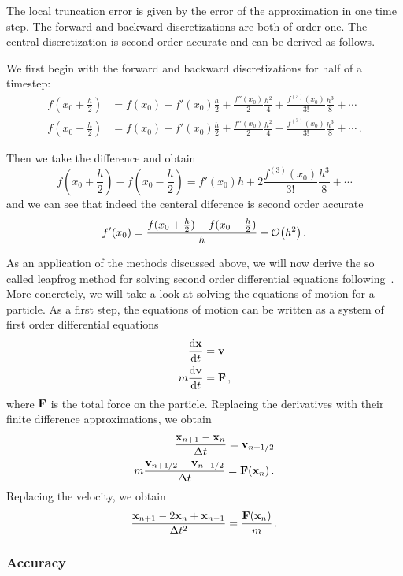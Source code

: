 \documentclass[class=report, crop=false]{standalone}
\begin{document}
The local truncation error is given by the error of the approximation in one time
step. The forward and backward discretizations are both of order one. The
central discretization is second order accurate and can be derived as follows.

We first begin with the forward and backward discretizations for half of a
timestep:
\begin{align*}
  f(x_0+\frac{h}{2}) &= f(x_0) + f'(x_0)\frac{h}{2} + \frac{f''(x_0)}{2}\frac{h^2}{4}
    + \frac{f^{(3)}(x_0)}{3!}\frac{h^3}{8} + \dotsb \\
  f(x_0-\frac{h}{2}) &= f(x_0) - f'(x_0)\frac{h}{2} + \frac{f''(x_0)}{2}\frac{h^2}{4}
    - \frac{f^{(3)}(x_0)}{3!}\frac{h^3}{8} + \dotsb \,.
\end{align*}

Then we take the difference and obtain
\[
  f(x_0+\frac{h}{2}) - f(x_0-\frac{h}{2}) = f'(x_0)h
    + 2\frac{f^{(3)}(x_0)}{3!}\frac{h^3}{8} + \dotsb
\]
and we can see that indeed the centeral diference is second order accurate
\[
  f'(x_0) = \frac{f(x_0+\frac{h}{2}) - f(x_0-\frac{h}{2})}{h} + \order{h^2}\,.
\]

As an application of the methods discussed above, we will now derive the so called
leapfrog method for solving second order differential equations
following~\textcite[Chapter~4]{hockney_computersimulation_1988}. More concretely,
we will take a look at solving the equations of motion for a particle. As a first
step, the equations of motion can be written as a system of first order differential
equations
\begin{align*}
  \dv{\vb{x}}{t} &= \vb{v} \\
  m \dv{\vb{v}}{t} &= \vb{F}\,,
\end{align*}
where \(\vb{F}\) is the total force on the particle. Replacing the derivatives
with their finite difference approximations, we obtain
\begin{align*}
  \frac{\vb{x}_{n+1} - \vb{x}_n}{\Delta t} = \vb{v}_{n+1/2} \\
  m \frac{\vb{v}_{n+1/2} - \vb{v}_{n-1/2}}{\Delta t} = \vb{F}(\vb{x}_n)\,.
\end{align*}
Replacing the velocity, we obtain
\begin{equation}
  \label{eq:leapfrog}
  \frac{\vb{x}_{n+1}-2\vb{x}_n+\vb{x}_{n-1}}{\Delta t^2} = \frac{\vb{F}(\vb{x}_n)}{m}\,.
\end{equation}

\subsubsection{Accuracy}
\end{document}
